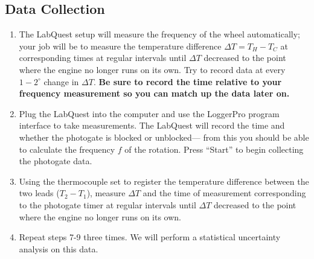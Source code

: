 \documentclass{article}
\newcommand\setItemnumber[1]{\setcounter{enumi}{\numexpr#1-1\relax}}
\begin{document}
\subsection{Data Collection}
\begin{enumerate}
    \setItemnumber{7}
    \item The LabQuest setup will measure the frequency of the wheel automatically; your job will be to measure the  temperature difference $\Delta T = T_H - T_C$ at corresponding times at regular intervals until $\Delta T$ decreased to the point where the engine no longer runs on its own. Try to record data at every $1-2^\circ$ change in $\Delta T$. \textbf{Be sure to record the time relative to your frequency measurement so you can match up the data later on.}%
    \item Plug the LabQuest into the computer and use the LoggerPro program interface to take measurements. The LabQuest will record the time and whether the photogate is blocked or unblocked--- from this you should be able to calculate the frequency $f$ of the rotation. Press ``Start'' to begin collecting the photogate data.
    \item Using the thermocouple set to register the temperature difference between the two leads ($T_2 - T_1$), measure $\Delta T$ and the time of measurement corresponding to the photogate timer at regular intervals until $\Delta T$ decreased to the point where the engine no longer runs on its own. 
    \item Repeat steps 7-9 three times. We will perform a statistical uncertainty analysis on this data.
\end{enumerate}
\end{document}
